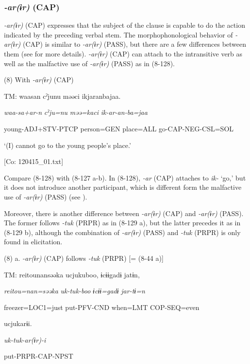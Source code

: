 \subsubsection{\textit{{}-ar(ɨr)} (CAP)}
\label{bkm:Ref366851018}
\textit{{}-ar(ɨr)} (CAP) expresses that the subject of the clause is capable to do the action indicated by the preceding verbal stem. The morphophonological behavior of \textit{{}-ar(ɨr)} (CAP) is similar to \textit{{}-ar(ɨr)} (PASS), but there are a few differences between them (see  for more details). \textit{{}-ar(ɨr)} (CAP) can attach to the intransitive verb as well as the malfactive use of \textit{{}-ar(ɨr)} (PASS) as in (8-128).

(8)  With \textit{{}-ar(ɨr)} (CAP)

  TM:  waasan  cˀjunu  məəci  ikjaranbajaa.

    \textit{waa-sa+ar-n}  \textit{cˀju=nu}  \textit{məə=kaci}  \textit{ik-ar{}-an-ba=jaa}

    young-ADJ+STV-PTCP  person=GEN  place=ALL  go-CAP-NEG-CSL=SOL

    ‘(I) cannot go to the young people’s place.’

    [Co: 120415\_01.txt]

Compare (8-128) with (8-127 a-b). In (8-128), \textit{{}-ar} (CAP) attaches to \textit{ik-} ‘go,’ but it does not introduce another participant, which is different form the malfactive use of \textit{{}-ar(ɨr)} (PASS) (see ).

  Moreover, there is another difference between \textit{{}-ar(ɨr)} (CAP) and \textit{{}-ar(ɨr)} (PASS). The former follows \textit{{}-tuk} (PRPR) as in (8-129 a), but the latter precedes it as in (8-129 b), although the combination of \textit{{}-ar(ɨr)} (PASS) and \textit{{}-tuk} (PRPR) is only found in elicitation.

(8)  a. \textit{{}-ar(ɨr)} (CAP) follows \textit{{}-tuk} (PRPR) [= (8-44 a)]

  TM:  {\textbar}reitou{\textbar}nansəəka  ucjukuboo,  ɨcɨɨgadɨ  jatɨn,

    \textit{reitou=nan=səəka}  \textit{uk-tuk-boo}  \textit{ɨcɨɨ=gadɨ}  \textit{jar-tɨ=n}

    freezer=LOC1=just  put-PFV-CND  when=LMT  COP-SEQ=even

    ucjukarɨi.

    \textit{uk-tuk-ar(ɨr){}-i}

    put-PRPR-CAP-NPST

